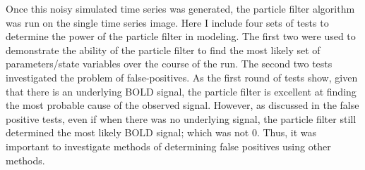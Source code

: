 Once this noisy simulated time series was generated, the particle filter algorithm
 was run on the single time series image. Here I include four sets of tests 
to determine the power of the particle filter in modeling. The first two were
used to demonstrate the ability of the particle filter to find the most likely
set of parameters/state variables over the course of the run. The second two 
tests investigated the problem of false-positives. As the first
round of tests show, given that there is an underlying BOLD signal, 
the particle filter is excellent at finding the most probable cause of 
the observed signal. However, as discussed in the false positive tests,
even if when there was no underlying signal, the particle filter still determined
the most likely BOLD signal; which was not 0. Thus, it was
important to investigate methods of determining false positives using 
other methods. 

